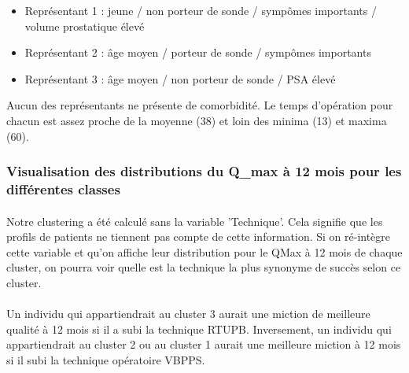 \documentclass[11pt]{article}
\providecommand{\tightlist}{%
      \setlength{\itemsep}{0pt}\setlength{\parskip}{0pt}}
\begin{document}
\begin{itemize}
\tightlist
\item
  Représentant 1 : jeune / non porteur de sonde / sympômes importants /
  volume prostatique élevé
\item
  Représentant 2 : âge moyen / porteur de sonde / sympômes importants
\item
  Représentant 3 : âge moyen / non porteur de sonde / PSA élevé
\end{itemize}

Aucun des représentants ne présente de comorbidité. Le temps d'opération
pour chacun est assez proche de la moyenne (38) et loin des minima (13)
et maxima (60).

    \subsubsection{Visualisation des distributions du Q\_max à 12 mois
pour les différentes
classes}\label{visualisation-des-distributions-du-q_max-uxe0-12-mois-pour-les-diffuxe9rentes-classes}

\paragraph{}
Notre clustering a été calculé sans la variable 'Technique'. Cela
signifie que les profils de patients ne tiennent pas compte de cette
information. Si on ré-intègre cette variable et qu'on affiche leur
distribution pour le QMax à 12 mois de chaque cluster, on pourra voir
quelle est la technique la plus synonyme de succès selon ce cluster.



    \begin{center}
    \end{center}
    
    
    \begin{center}
    \end{center}
    
    
    \begin{center}
    \end{center}
    
    
\paragraph{}Un individu qui appartiendrait au cluster 3 aurait une miction de
meilleure qualité à 12 mois si il a subi la technique RTUPB.
Inversement, un individu qui appartiendrait au cluster 2 ou au cluster 1
aurait une meilleure miction à 12 mois si il subi la technique
opératoire VBPPS.
\end{document}
